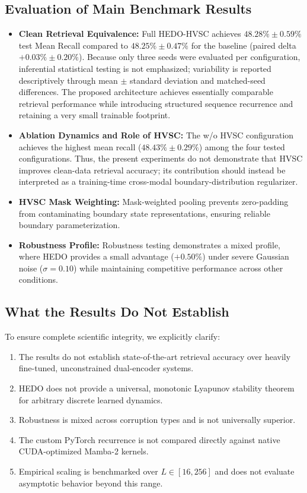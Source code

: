 \documentclass[pdflatex,sn-mathphys-num]{sn-jnl}%
\begin{document}
\subsection{Evaluation of Main Benchmark Results}
\begin{itemize}
    \item \textbf{Clean Retrieval Equivalence:} Full HEDO-HVSC achieves $48.28\% \pm 0.59\%$ test Mean Recall compared to $48.25\% \pm 0.47\%$ for the baseline (paired delta $+0.03\% \pm 0.20\%$). Because only three seeds were evaluated per configuration, inferential statistical testing is not emphasized; variability is reported descriptively through mean $\pm$ standard deviation and matched-seed differences. The proposed architecture achieves essentially comparable retrieval performance while introducing structured sequence recurrence and retaining a very small trainable footprint.
    \item \textbf{Ablation Dynamics and Role of HVSC:} The w/o HVSC configuration achieves the highest mean recall ($48.43\% \pm 0.29\%$) among the four tested configurations. Thus, the present experiments do not demonstrate that HVSC improves clean-data retrieval accuracy; its contribution should instead be interpreted as a training-time cross-modal boundary-distribution regularizer.
    \item \textbf{HVSC Mask Weighting:} Mask-weighted pooling prevents zero-padding from contaminating boundary state representations, ensuring reliable boundary parameterization.
    \item \textbf{Robustness Profile:} Robustness testing demonstrates a mixed profile, where HEDO provides a small advantage ($+0.50\%$) under severe Gaussian noise ($\sigma=0.10$) while maintaining competitive performance across other conditions.
\end{itemize}

\subsection{What the Results Do Not Establish}
To ensure complete scientific integrity, we explicitly clarify:
\begin{enumerate}
    \item The results do not establish state-of-the-art retrieval accuracy over heavily fine-tuned, unconstrained dual-encoder systems.
    \item HEDO does not provide a universal, monotonic Lyapunov stability theorem for arbitrary discrete learned dynamics.
    \item Robustness is mixed across corruption types and is not universally superior.
    \item The custom PyTorch recurrence is not compared directly against native CUDA-optimized Mamba-2 kernels.
    \item Empirical scaling is benchmarked over $L \in [16, 256]$ and does not evaluate asymptotic behavior beyond this range.
\end{enumerate}
\end{document}

